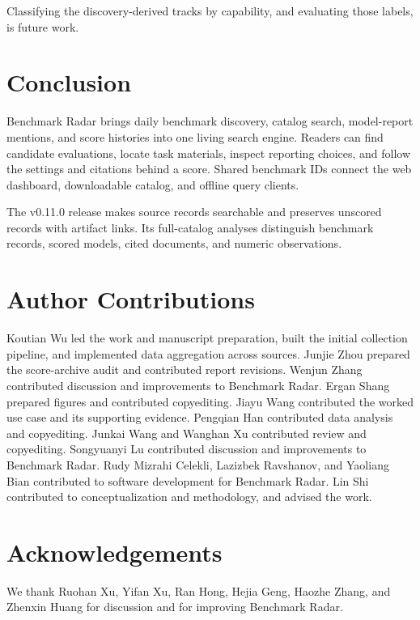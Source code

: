 \documentclass[11pt]{article}
\newcommand{\ReportNumber}[1]{\pgfmathprintnumber[fixed,precision=0,1000 sep={,},assume math mode=true]{#1}}
\begin{document}
Classifying the \ReportNumber{\CensusUnclassified} discovery-derived tracks by capability, and evaluating those labels, is future work.

\section{Conclusion}

Benchmark Radar brings daily benchmark discovery, catalog search, model-report mentions, and score histories into one living search engine. Readers can find candidate evaluations, locate task materials, inspect reporting choices, and follow the settings and citations behind a score. Shared benchmark IDs connect the web dashboard, downloadable catalog, and offline query clients.

The v0.11.0 release makes \ReportNumber{\CensusRecords} source records searchable and preserves \CensusNoScoreWithLinks{} unscored records with artifact links. Its full-catalog analyses distinguish benchmark records, scored models, cited documents, and numeric observations.

\section*{Author Contributions}
\label{sec:author-contributions}

Koutian Wu led the work and manuscript preparation, built the initial collection pipeline, and implemented data aggregation across sources. Junjie Zhou prepared the score-archive audit and contributed report revisions. Wenjun Zhang contributed discussion and improvements to Benchmark Radar. Ergan Shang prepared figures and contributed copyediting. Jiayu Wang contributed the worked use case and its supporting evidence. Pengqian Han contributed data analysis and copyediting. Junkai Wang and Wanghan Xu contributed review and copyediting. Songyuanyi Lu contributed discussion and improvements to Benchmark Radar. Rudy Mizrahi Celekli, Lazizbek Ravshanov, and Yaoliang Bian contributed to software development for Benchmark Radar. Lin Shi contributed to conceptualization and methodology, and advised the work.

\section*{Acknowledgements}
\label{sec:acknowledgements}

We thank Ruohan Xu, Yifan Xu, Ran Hong, Hejia Geng, Haozhe Zhang, and Zhenxin Huang for discussion and for improving Benchmark Radar.
\end{document}
